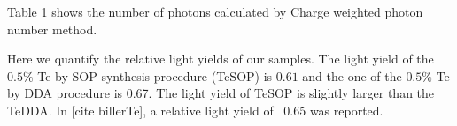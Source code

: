Table 1 shows the number of photons calculated by Charge weighted photon number method.

Here we quantify the relative light yields of our samples. The light yield of the $0.5\%$ Te by SOP synthesis procedure (TeSOP) is $0.61$ and the one of the $0.5\%$ Te by DDA procedure is 0.67. The light yield of TeSOP is slightly larger than the TeDDA. In [cite billerTe],  a relative light yield of ~0.65 was reported.


%
%
%
%
%
%
%
%
%
%
%
%
%
%
%
%
%

